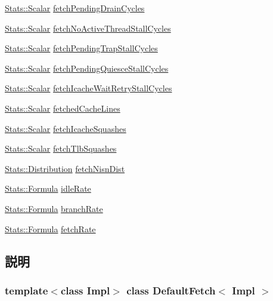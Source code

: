\begin{DoxyCompactItemize}
\item 
\hyperlink{classStats_1_1Scalar}{Stats::Scalar} \hyperlink{classDefaultFetch_ad09f9a8597b6f2c627b5c116d85ea375}{fetchPendingDrainCycles}
\item 
\hyperlink{classStats_1_1Scalar}{Stats::Scalar} \hyperlink{classDefaultFetch_aaa3b110a1f8e4fb7c88676a2ee836a06}{fetchNoActiveThreadStallCycles}
\item 
\hyperlink{classStats_1_1Scalar}{Stats::Scalar} \hyperlink{classDefaultFetch_a5a80cd5375f1281e64f0dd318cc761d2}{fetchPendingTrapStallCycles}
\item 
\hyperlink{classStats_1_1Scalar}{Stats::Scalar} \hyperlink{classDefaultFetch_a8be39e4ea9ed9168227dc6efced55f3f}{fetchPendingQuiesceStallCycles}
\item 
\hyperlink{classStats_1_1Scalar}{Stats::Scalar} \hyperlink{classDefaultFetch_a85ea1666f596116bc53a277b388d39d7}{fetchIcacheWaitRetryStallCycles}
\item 
\hyperlink{classStats_1_1Scalar}{Stats::Scalar} \hyperlink{classDefaultFetch_a0ead660daa133edcd64ac552d473ebba}{fetchedCacheLines}
\item 
\hyperlink{classStats_1_1Scalar}{Stats::Scalar} \hyperlink{classDefaultFetch_af5ce6113f31fddaab758b8fb025600bc}{fetchIcacheSquashes}
\item 
\hyperlink{classStats_1_1Scalar}{Stats::Scalar} \hyperlink{classDefaultFetch_afe07cb06e5135b2305320fa11fda71af}{fetchTlbSquashes}
\item 
\hyperlink{classStats_1_1Distribution}{Stats::Distribution} \hyperlink{classDefaultFetch_a4793a4a8857c13e7812b1c37c6df761b}{fetchNisnDist}
\item 
\hyperlink{classStats_1_1Formula}{Stats::Formula} \hyperlink{classDefaultFetch_a4b942e4ec6b8c1d29a1c96e901ea71dd}{idleRate}
\item 
\hyperlink{classStats_1_1Formula}{Stats::Formula} \hyperlink{classDefaultFetch_abceba4006d416e352df47f692b589bc3}{branchRate}
\item 
\hyperlink{classStats_1_1Formula}{Stats::Formula} \hyperlink{classDefaultFetch_a7656c6cac3b62fa389148c650a5d127a}{fetchRate}
\end{DoxyCompactItemize}


\subsection{説明}
\subsubsection*{template$<$class Impl$>$ class DefaultFetch$<$ Impl $>$}

